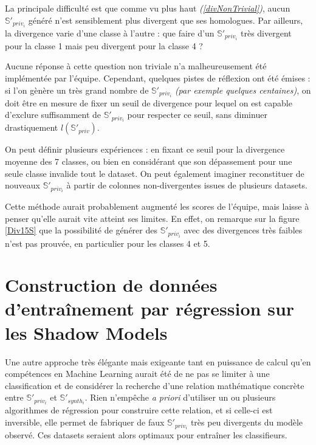             La principale difficulté est que comme vu plus haut \textit{(\ref{divNonTrivial})},
            aucun $\mathbb{S}'_{priv_i}$ généré n'est sensiblement plus divergent que ses
            homologues. Par ailleurs, la divergence varie d'une classe à l'autre : que faire d'un $\mathbb{S}'_{priv_i}$
            très divergent pour la classe 1 mais peu divergent pour la classe 4 ?


            \begin{tcolorbox}[colback=linkborder_Color!5!white,colframe=linkborder_Color!75!black]
                Aucune réponse à cette question non triviale n'a malheureusement été implémentée
                par l'équipe. Cependant, quelques pistes de réflexion ont été émises :
                si l'on gènère un très grand nombre de $\mathbb{S}'_{priv_i}$
                \textit{(par exemple quelques centaines)}, on doit être en mesure de fixer un
                seuil de divergence pour lequel on est capable d'exclure suffisamment de $\mathbb{S}'_{priv_i}$ pour respecter ce seuil,
                sans diminuer drastiquement $l\left( \mathbb S'_{priv} \right)$.

                On peut définir plusieurs expériences : en fixant ce seuil pour la divergence
                moyenne des 7 classes, ou bien en considérant que son dépassement pour une seule
                classe invalide tout le dataset. On peut également imaginer reconstituer de
                nouveaux $\mathbb{S}'_{priv_i}$ à partir de colonnes non-divergentes
                issues de plusieurs datasets.

                Cette méthode aurait probablement augmenté les scores de l'équipe, mais laisse à
                penser qu'elle aurait vite atteint ses limites. En effet, on remarque sur la
                figure \ref{Div15S} que la possibilité de générer des $\mathbb{S}'_{priv_i}$ avec des
                divergences très faibles n'est pas prouvée, en particulier pour les classes 4 et
                5.
            \end{tcolorbox}
    \section{Construction de données d'entraînement par régression sur les Shadow Models}
\label{regression}
        Une autre approche très élégante mais exigeante tant en puissance de calcul qu'en
        compétences en Machine Learning aurait été de ne pas se limiter à une classification et
        de considérer la recherche d'une relation mathématique concrète entre
        $\mathbb{S}'_{priv_i}$ et $\mathbb{S}'_{synth_i}$. Rien n'empêche \textit{a priori}
        d'utiliser un ou plusieurs algorithmes de régression pour construire cette relation, et
        si celle-ci est inversible, elle permet de fabriquer de faux $\mathbb{S}'_{priv_i}$ très
        peu divergents du modèle observé. Ces datasets seraient alors optimaux pour entraîner les
        classifieurs.


